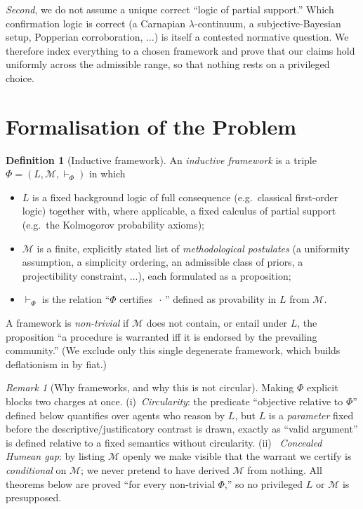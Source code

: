 \documentclass{amsart}
\theoremstyle{definition}
\newtheorem{definition}{Definition}
\theoremstyle{plain}
\theoremstyle{remark}
\newtheorem{remark}{Remark}
\begin{document}
\emph{Second}, we do not assume a unique correct ``logic of partial support.''
Which confirmation logic is correct (a Carnapian $\lambda$-continuum, a
subjective-Bayesian setup, Popperian corroboration, $\dots$) is itself a
contested normative question. We therefore index everything to a chosen
framework and prove that our claims hold uniformly across the admissible range,
so that nothing rests on a privileged choice.

\section{Formalisation of the Problem}

\begin{definition}[Inductive framework]\label{def:framework}
An \emph{inductive framework} is a triple $\Phi=(L,\mathcal{M},\vdash_\Phi)$ in
which
\begin{itemize}
\item $L$ is a fixed background logic of full consequence (e.g.\ classical
first-order logic) together with, where applicable, a fixed calculus of partial
support (e.g.\ the Kolmogorov probability axioms);
\item $\mathcal{M}$ is a finite, explicitly stated list of \emph{methodological
postulates} (a uniformity assumption, a simplicity ordering, an admissible
class of priors, a projectibility constraint, $\dots$), each formulated as a
proposition;
\item $\vdash_\Phi$ is the relation ``$\Phi$ certifies $\,\cdot\,$'' defined as
provability in $L$ from $\mathcal{M}$.
\end{itemize}
A framework is \emph{non-trivial} if $\mathcal{M}$ does not contain, or entail
under $L$, the proposition ``a procedure is warranted iff it is endorsed by the
prevailing community.'' (We exclude only this single degenerate framework,
which builds deflationism in by fiat.)
\end{definition}

\begin{remark}[Why frameworks, and why this is not circular]\label{rem:circ}
Making $\Phi$ explicit blocks two charges at once. (i)~\emph{Circularity}: the
predicate ``objective relative to $\Phi$'' defined below quantifies over agents
who reason by $L$, but $L$ is a \emph{parameter} fixed before the
descriptive\slash justificatory contrast is drawn, exactly as ``valid
argument'' is defined relative to a fixed semantics without circularity. (ii)~
\emph{Concealed Humean gap}: by listing $\mathcal{M}$ openly we make visible
that the warrant we certify is \emph{conditional} on $\mathcal{M}$; we never
pretend to have derived $\mathcal{M}$ from nothing. All theorems below are
proved ``for every non-trivial $\Phi$,'' so no privileged $L$ or $\mathcal{M}$
is presupposed.
\end{remark}
\end{document}
